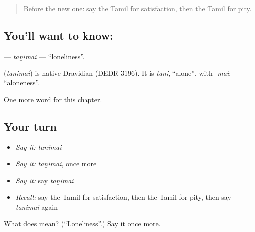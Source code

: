 \label{lesson:TA-C239-tanimai}



\begin{quote}
Before the new one: say the Tamil for satisfaction, then the Tamil for pity.
\end{quote}

\subsection*{You'll want to know: }
\textbf{} — \emph{taṉimai} — \textquotedblleft{}loneliness\textquotedblright{}.

\begin{cousinweb}
\textbf{} (\emph{taṉimai}) is native Dravidian (DEDR 3196). It is \emph{taṉi}, \textquotedblleft{}alone\textquotedblright{}, with \emph{-mai}: \textquotedblleft{}aloneness\textquotedblright{}.
\end{cousinweb}

\begin{grammarlens}[title={What you've built}]
One more word for this chapter.
\end{grammarlens}

\subsection*{Your turn}
\begin{itemize}
\raggedright
  \item \emph{Say it:} \emph{taṉimai}
  \item \emph{Say it:} \emph{taṉimai}, once more
  \item \emph{Say it:} say \emph{taṉimai}
  \item \emph{Recall:} say the Tamil for satisfaction, then the Tamil for pity, then say \emph{taṉimai} again
\end{itemize}

\begin{tcolorbox}[breakable,colback=teal!4,colframe=teal!35!black,title={Before you move on}]
What does  mean? (\textquotedblleft{}Loneliness\textquotedblright{}.) Say it once more.
\end{tcolorbox}
